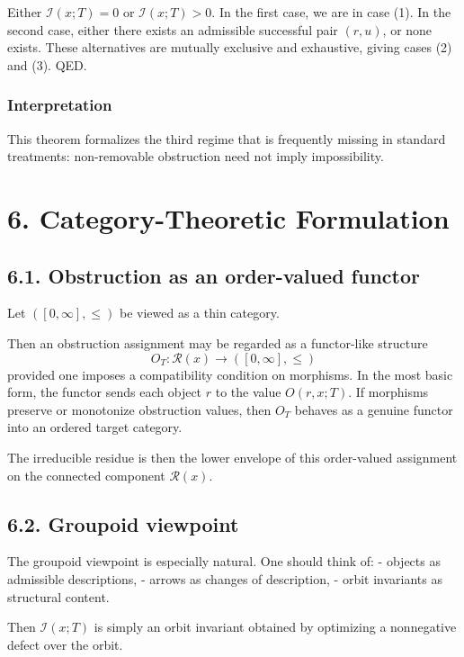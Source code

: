 \documentclass[
]{article}
\begin{document}
Either \(\mathcal{I}(x;T)=0\) or \(\mathcal{I}(x;T)>0\). In the first
case, we are in case (1). In the second case, either there exists an
admissible successful pair \((r,u)\), or none exists. These alternatives
are mutually exclusive and exhaustive, giving cases (2) and (3). QED.

\subsubsection{Interpretation}\label{interpretation}

This theorem formalizes the third regime that is frequently missing in
standard treatments: non-removable obstruction need not imply
impossibility.

\section{6. Category-Theoretic
Formulation}\label{category-theoretic-formulation}

\subsection{6.1. Obstruction as an order-valued
functor}\label{obstruction-as-an-order-valued-functor}

Let \(([0,\infty], \le)\) be viewed as a thin category.

Then an obstruction assignment may be regarded as a functor-like
structure \[
O_T: \mathcal{R}(x) \to ([0,\infty],\le)
\] provided one imposes a compatibility condition on morphisms. In the
most basic form, the functor sends each object \(r\) to the value
\(O(r,x;T)\). If morphisms preserve or monotonize obstruction values,
then \(O_T\) behaves as a genuine functor into an ordered target
category.

The irreducible residue is then the lower envelope of this order-valued
assignment on the connected component \(\mathcal{R}(x)\).

\subsection{6.2. Groupoid viewpoint}\label{groupoid-viewpoint}

The groupoid viewpoint is especially natural. One should think of: -
objects as admissible descriptions, - arrows as changes of description,
- orbit invariants as structural content.

Then \(\mathcal{I}(x;T)\) is simply an orbit invariant obtained by
optimizing a nonnegative defect over the orbit.
\end{document}
